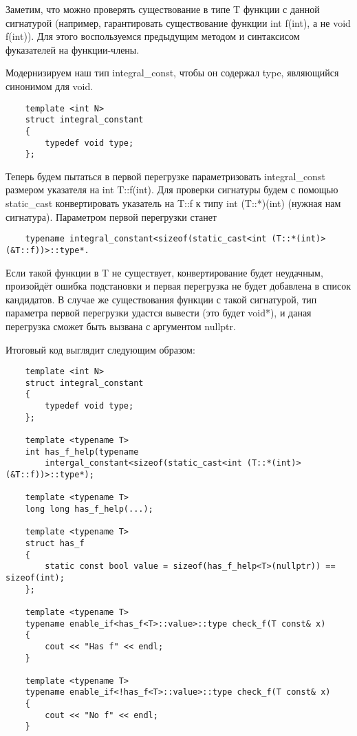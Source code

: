 	Заметим, что можно проверять существование в типе T функции с данной сигнатурой (например, гарантировать существование функции int f(int), а не void f(int)). Для этого воспользуемся предыдущим методом и синтаксисом фуказателей на функции-члены.
	
	Модернизируем наш тип integral\_const, чтобы он содержал type, являющийся синонимом для void.

	\begin{verbatim}
	template <int N>
	struct integral_constant
	{
	    typedef void type;
	};
	\end{verbatim}
	
	Теперь будем пытаться в первой перегрузке параметризовать integral\_const размером указателя на int T::f(int). Для проверки сигнатуры будем с помощью static\_cast конвертировать указатель на T::f к типу int (T::*)(int) (нужная нам сигнатура). Параметром первой перегрузки станет 
	
	\begin{verbatim}
	typename integral_constant<sizeof(static_cast<int (T::*(int)>(&T::f))>::type*. 
	\end{verbatim}
	
	Если такой функции в T не существует, конвертирование будет неудачным, произойдёт ошибка подстановки и первая перегрузка не будет добавлена в список кандидатов. В случае же существования функции с такой сигнатурой, тип параметра первой перегрузки удастся вывести (это будет void*), и даная перегрузка сможет быть вызвана с аргументом nullptr.
	
	Итоговый код выглядит следующим образом:
	
	\begin{verbatim}
	template <int N>
	struct integral_constant
	{
	    typedef void type;
	};

	template <typename T>
	int has_f_help(typename 
	    intergal_constant<sizeof(static_cast<int (T::*(int)>(&T::f))>::type*);

	template <typename T>
	long long has_f_help(...);

	template <typename T>
	struct has_f
	{
	    static const bool value = sizeof(has_f_help<T>(nullptr)) == sizeof(int);
	};

	template <typename T>
	typename enable_if<has_f<T>::value>::type check_f(T const& x)
	{
	    cout << "Has f" << endl;
	}

	template <typename T>
	typename enable_if<!has_f<T>::value>::type check_f(T const& x)
	{
	    cout << "No f" << endl;
	}
	\end{verbatim}
